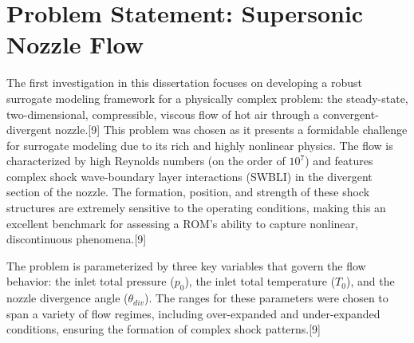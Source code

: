 \documentclass[12pt, a4paper]{report}
\begin{document}
\section{Problem Statement: Supersonic Nozzle Flow}
The first investigation in this dissertation focuses on developing a robust surrogate modeling framework for a physically complex problem: the steady-state, two-dimensional, compressible, viscous flow of hot air through a convergent-divergent nozzle.[9] This problem was chosen as it presents a formidable challenge for surrogate modeling due to its rich and highly nonlinear physics. The flow is characterized by high Reynolds numbers (on the order of $10^7$) and features complex shock wave-boundary layer interactions (SWBLI) in the divergent section of the nozzle. The formation, position, and strength of these shock structures are extremely sensitive to the operating conditions, making this an excellent benchmark for assessing a ROM's ability to capture nonlinear, discontinuous phenomena.[9]

The problem is parameterized by three key variables that govern the flow behavior: the inlet total pressure ($p_0$), the inlet total temperature ($T_0$), and the nozzle divergence angle ($\theta_{div}$). The ranges for these parameters were chosen to span a variety of flow regimes, including over-expanded and under-expanded conditions, ensuring the formation of complex shock patterns.[9]
\end{document}
